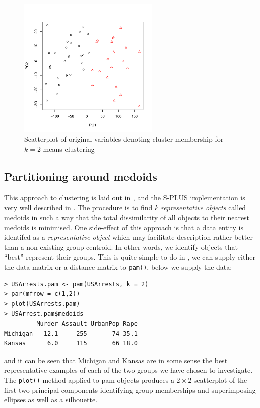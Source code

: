 \begin{figure}
\begin{center}
\includegraphics[width = 0.6\textwidth]{images/km2classpca}
\caption{Scatterplot of original variables denoting cluster membership for $k=2$ means clustering}
\label{hclust}
\end{center}
\end{figure}


\subsection{Partitioning around medoids}

This approach to clustering is laid out in \cite{Kaufman+Rousseeuw:1989}, and the S-PLUS implementation is very well described in \cite{Struyf+etal:1997}.   The procedure is to find $k$ \emph{representative objects} called medoids in such a way that the total dissimilarity of all objects to their nearest medoids is minimised.   One side-effect of this approach is that a data entity is identifed as a \emph{representative object} which may facilitate description rather better than a non-existing group centroid.   In other words, we identify objects that ``best'' represent their groups.   This is quite simple to do in \R, we can supply either the data matrix or a distance matrix to \verb+pam()+, below we supply the data:
\singlespacing
\begin{verbatim}
> USArrests.pam <- pam(USArrests, k = 2)
> par(mfrow = c(1,2))
> plot(USArrests.pam)
> USArrest.pam$medoids
         Murder Assault UrbanPop Rape
Michigan   12.1     255       74 35.1
Kansas      6.0     115       66 18.0
\end{verbatim}
\onehalfspacing
and it can be seen that Michigan and Kansas are in some sense the best representative examples of each of the two groups we have chosen to investigate.   The \verb+plot()+ method applied to pam objects produces a $2 \times 2$ scatterplot of the first two principal components identifying group memberships and superimposing ellipses as well as a silhouette.

